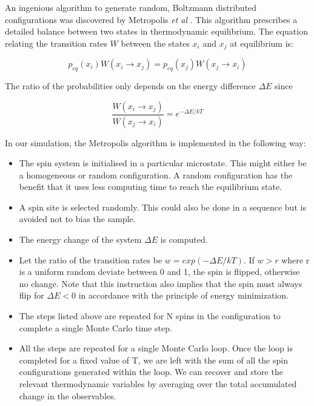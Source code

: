 \documentclass[a4paper]{article}
\begin{document}
An ingenious algorithm to generate random, Boltzmann distributed configurations was discovered by Metropolis \textit{et al} \cite{met}. This algorithm prescribes a detailed balance between two states in thermodynamic equilibrium. The equation relating the transition rates $W$ between the states $x_i$ and $x_j$ at equilibrium is:  

\begin{equation}
p_{eq}(x_i)W(x_i \rightarrow x_j) = p_{eq}(x_j)W(x_j \rightarrow x_i)
\end{equation}

The ratio of the probabilities only depends on the energy difference $\Delta E$ since

\begin{equation}
\frac{W(x_i \rightarrow x_j)}{W(x_j \rightarrow x_i)} =  e^{-\Delta E/kT}
\end{equation}

 
In our simulation, the Metropolis algorithm is implemented in the following way:
\begin{itemize}
\item The spin system is initialised in a particular microstate. This might either be a homogeneous or random configuration. A random configuration has the benefit that it uses less computing time to reach the equilibrium state.
\item A spin site is selected randomly. This could also be done in a sequence but is avoided  not to bias the sample.
\item The energy change of the system $\Delta E$ is computed.
\item Let the ratio of the transition rates be $w = exp(-\Delta E/kT)$. If $w > r$ where r is a uniform random deviate between 0 and 1, the spin is flipped, otherwise no change. Note that this instruction also implies that the spin must always flip for $\Delta E < 0 $ in accordance with the principle of energy minimization. 
\item The steps listed above are repeated for N spins in the configuration to complete a single Monte Carlo time step.
\item All the steps are repeated for a single Monte Carlo loop. Once the loop is completed for a fixed value of T, we are left with the sum of all the spin configurations generated within the loop. We can recover and store the relevant thermodynamic variables by averaging over the total accumulated change in the observables.
\end{itemize}
\end{document}
